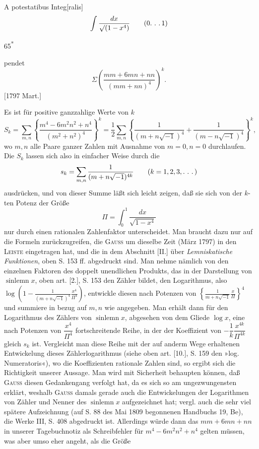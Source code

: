 \indent A potestatibus Integ[ralis]
\[
\int\frac{dx}{\surd(1-x^4)}\qquad(0\ldotp\,\ldotp\,\ldotp1)
\]
\par\vfill\noindent\hfill65\textsuperscript{*}

\clearpage{}
\noindent pendet
\[
\Sigma\left(\frac{mm+6mn+nn}{(mm+nn)^4}\right)^k.
\]
\noindent\hfill[1797 Mart.]

\medskip\begingroup\small
\indent Es ist für positive ganzzahlige Werte von \(k\)
\[
S_k=\sum_{m,n}\left\{\frac{m^4-6m^2n^2+n^4}{(m^2+n^2)^4}\right\}^k
=\frac12\sum_{m,n}\left\{\frac1{(m+n\sqrt{-1})^4}+\frac1{(m-n\sqrt{-1})^4}\right\}^k,
\]
\noindent wo \(m,n\) alle Paare ganzer Zahlen mit Ausnahme von \(m=0,n=0\) durchlaufen. Die \(S_k\) lassen sich also in einfacher Weise durch die
\[
s_k=\sum_{m,n}\frac1{(m+n\sqrt{-1})^{4k}}\qquad(k=1,2,3,\ldotp\,\ldotp\,\ldotp)
\]
\noindent ausdrücken, und von dieser Summe läßt sich leicht zeigen, daß sie sich von der \(k\)-ten Potenz der Größe
\[
\Pi=\int_0^1\frac{dx}{\sqrt{1-x^4}}
\]
\noindent nur durch einen rationalen Zahlenfaktor unterscheidet. Man braucht dazu nur auf die Formeln zurückzugreifen, die \textsc{Gauss} um dieselbe Zeit (März 1797) in den \textsc{Leiste} eingetragen hat, und die in dem Abschnitt [II.] über \textit{Lemniskatische Funktionen}, oben S. 153 ff. abgedruckt sind. Man nehme nämlich von den einzelnen Faktoren des doppelt unendlichen Produkts, das in der Darstellung von \(\operatorname{sinlemn}x\), oben art. [2.], S. 153 den Zähler bildet, den Logarithmus, also \(\displaystyle\log\left(1-\frac1{(m+n\sqrt{-1})^4}\frac{x^4}{\Pi^4}\right)\), entwickle diesen nach Potenzen von \(\displaystyle\left\{\frac1{m+n\sqrt{-1}}\frac{x}{\Pi}\right\}^4\) und summiere in bezug auf \(m,n\) wie angegeben. Man erhält dann für den Logarithmus des Zählers von \(\operatorname{sinlemn}x\), abgesehen von dem Gliede \(\log x\), eine nach Potenzen von \(\dfrac{x^4}{\Pi^4}\) fortschreitende Reihe, in der der Koeffizient von \(-\dfrac1k\dfrac{x^{4k}}{\Pi^{4k}}\) gleich \(s_k\) ist. Vergleicht man diese Reihe mit der auf anderm Wege erhaltenen Entwickelung dieses Zählerlogarithmus (siehe oben art. [10.], S. 159 den »log. Numeratoris«), wo die Koeffizienten rationale Zahlen sind, so ergibt sich die Richtigkeit unserer Aussage. Man wird mit Sicherheit behaupten können, daß \textsc{Gauss} diesen Gedankengang verfolgt hat, da es sich so am ungezwungensten erklärt, weshalb \textsc{Gauss} damals gerade auch die Entwickelungen der Logarithmen von Zähler und Nenner des \(\operatorname{sinlemn}x\) aufgezeichnet hat; vergl. auch die sehr viel spätere Aufzeichnung (auf S. 88 des Mai 1809 begonnenen Handbuchs 19, Be), die Werke III, S. 408 abgedruckt ist. Allerdings würde dann das \(mm+6mn+nn\) in unserer Tagebuchnotiz als Schreibfehler für \(m^4-6m^2n^2+n^4\) gelten müssen, was aber umso eher angeht, als die Größe
